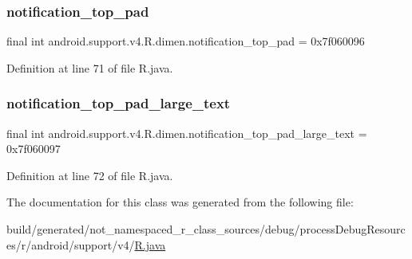 \subsubsection{\texorpdfstring{notification\_top\_pad}{notification\_top\_pad}}
{\footnotesize\ttfamily final int android.\+support.\+v4.\+R.\+dimen.\+notification\+\_\+top\+\_\+pad = 0x7f060096\hspace{0.3cm}{\ttfamily [static]}}



Definition at line 71 of file R.\+java.

\mbox{\label{classandroid_1_1support_1_1v4_1_1_r_1_1dimen_a015ea491d800aa6186dff18e64c0c947}} 
\subsubsection{\texorpdfstring{notification\_top\_pad\_large\_text}{notification\_top\_pad\_large\_text}}
{\footnotesize\ttfamily final int android.\+support.\+v4.\+R.\+dimen.\+notification\+\_\+top\+\_\+pad\+\_\+large\+\_\+text = 0x7f060097\hspace{0.3cm}{\ttfamily [static]}}



Definition at line 72 of file R.\+java.



The documentation for this class was generated from the following file\+:\begin{DoxyCompactItemize}
\item 
build/generated/not\+\_\+namespaced\+\_\+r\+\_\+class\+\_\+sources/debug/process\+Debug\+Resources/r/android/support/v4/\mbox{\hyperlink{android_2support_2v4_2_r_8java}{R.\+java}}\end{DoxyCompactItemize}

